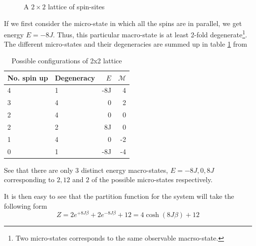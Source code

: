 \documentclass[10pt,showpacs,preprintnumbers,amsmath,amssymb,nofootinbib,aps,prl,twocolumn,groupedaddress,superscriptaddress,showkeys]{revtex4-1}
\begin{document}
     \begin{figure}[H]
      \centering
      \caption{A $2\times2$ lattice of spin-sites}
    \end{figure}

    If we first consider the micro-state in which all the spins are in parallel, we get energy $E=-8J$. Thus, this particular macro-state is at least 2-fold degenerate\footnote{Two micro-states corresponds to the same observable macrso-state.}.
    The different micro-states and their degeneracies are summed up in table \ref{tab:2x2energies} from \textcite{statmek_lecnotes}

    \begin{table}[H]
      \centering
      \caption{\label{tab:2x2energies} Possible configurations of 2x2 lattice}
      \begin{tabular}{llrr}
        No. spin up & Degeneracy & $E$ & $\mathcal M$ \\ \hline
        4 & 1 & -8J & 4 \\
        3 & 4 & 0 & 2 \\
        2 & 4 & 0 & 0 \\
        2 & 2 & 8J & 0 \\
        1 & 4 & 0 & -2 \\
        0 & 1 & -8J & -4 \\ \hline
      \end{tabular}
    \end{table}

    See that there are only 3 distinct energy macro-states, $E=-8J, 0, 8J$ corresponding to $2, 12$ and $2$ of the possible micro-states respectively.

    It is then easy to see that the partition function for the system will take the following form
    \begin{equation}
      Z = 2e^{+8J\beta} + 2e^{-8J\beta} + 12 = 4\cosh(8J\beta) + 12
    \end{equation}
\end{document}
